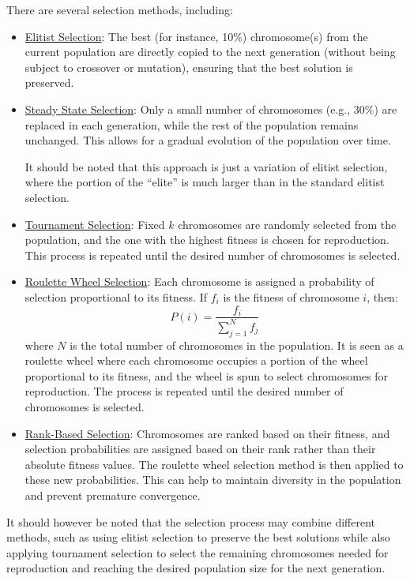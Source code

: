 There are several selection methods, including:
\begin{itemize}
    \item \ul{Elitist Selection}: The best (for instance, 10\%) chromosome(s) from the current population are directly copied to the next generation (without being subject to crossover or mutation), ensuring that the best solution is preserved.
    \item \ul{Steady State Selection}: Only a small number of chromosomes (e.g., 30\%) are replaced in each generation, while the rest of the population remains unchanged. This allows for a gradual evolution of the population over time.
    
    It should be noted that this approach is just a variation of elitist selection, where the portion of the ``elite'' is much larger than in the standard elitist selection.
    \item \ul{Tournament Selection}: Fixed $k$ chromosomes are randomly selected from the population, and the one with the highest fitness is chosen for reproduction. This process is repeated until the desired number of chromosomes is selected.
    \item \ul{Roulette Wheel Selection}: Each chromosome is assigned a probability of selection proportional to its fitness. If $f_i$ is the fitness of chromosome $i$, then:
    \[
        P(i) = \frac{f_i}{\sum\limits_{j=1}^{N} f_j}
    \]
    where $N$ is the total number of chromosomes in the population.   
    It is seen as a roulette wheel where each chromosome occupies a portion of the wheel proportional to its fitness, and the wheel is spun to select chromosomes for reproduction. The process is repeated until the desired number of chromosomes is selected.
    \item \ul{Rank-Based Selection}: Chromosomes are ranked based on their fitness, and selection probabilities are assigned based on their rank rather than their absolute fitness values. The roulette wheel selection method is then applied to these new probabilities. This can help to maintain diversity in the population and prevent premature convergence.
\end{itemize}

It should however be noted that the selection process may combine different methods, such as using elitist selection to preserve the best solutions while also applying tournament selection to select the remaining chromosomes needed for reproduction and reaching the desired population size for the next generation.
